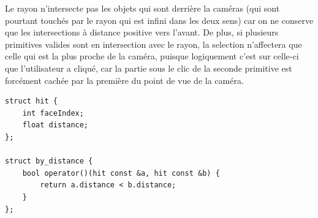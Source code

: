 Le rayon n'intersecte pas les objets qui sont derrière la caméras (qui sont pourtant touchés par le rayon qui est infini dans les deux sens) car on ne conserve que les intersections à distance positive vers l'avant. De plus, si plusieurs primitives valides sont en intersection avec le rayon, la selection n'affectera que celle qui est la plus proche de la caméra, puisque logiquement c'est sur celle-ci que l'utilisateur a cliqué, car la partie sous le clic de la seconde primitive est forcément cachée par la première du point de vue de la caméra.

\begin{lstlisting}
struct hit {
	int faceIndex;
	float distance;
};

struct by_distance {
	bool operator()(hit const &a, hit const &b) {
		return a.distance < b.distance;
	}
};
\end{lstlisting}

